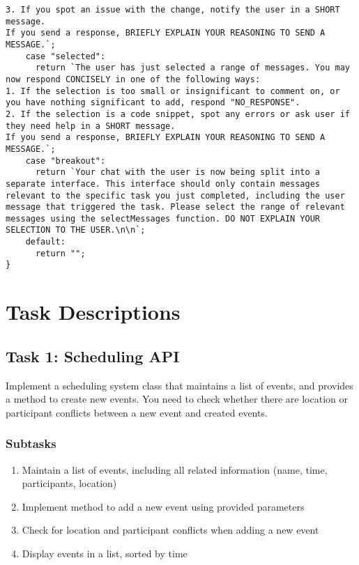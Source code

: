 \begin{lstlisting}
3. If you spot an issue with the change, notify the user in a SHORT message.
If you send a response, BRIEFLY EXPLAIN YOUR REASONING TO SEND A MESSAGE.`;
    case "selected":
      return `The user has just selected a range of messages. You may now respond CONCISELY in one of the following ways:
1. If the selection is too small or insignificant to comment on, or you have nothing significant to add, respond "NO_RESPONSE".
2. If the selection is a code snippet, spot any errors or ask user if they need help in a SHORT message.
If you send a response, BRIEFLY EXPLAIN YOUR REASONING TO SEND A MESSAGE.`;
    case "breakout":
      return `Your chat with the user is now being split into a separate interface. This interface should only contain messages relevant to the specific task you just completed, including the user message that triggered the task. Please select the range of relevant messages using the selectMessages function. DO NOT EXPLAIN YOUR SELECTION TO THE USER.\n\n`;
    default:
      return "";
}
\end{lstlisting}

\section{Task Descriptions}
\label{appendix:task}
\subsection{Task 1: Scheduling API}

Implement a scheduling system class that maintains a list of events, and provides a method to create new events. You need to check whether there are location or participant conflicts between a new event and created events.

\subsubsection{Subtasks}

\begin{enumerate}
    \item Maintain a list of events, including all related information (name, time, participants, location)
    \item Implement method to add a new event using provided parameters 
    \item Check for location and participant conflicts when adding a new event
    \item Display events in a list, sorted by time
\end{enumerate}

